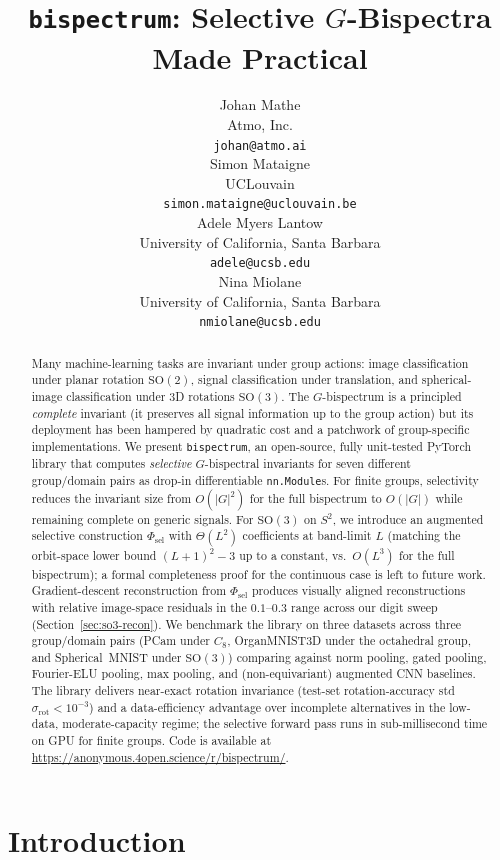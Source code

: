 \documentclass{article}
\title{\texttt{bispectrum}: Selective $G$-Bispectra Made Practical}
\author{%
  Johan Mathe \\
  Atmo, Inc. \\
  \texttt{johan@atmo.ai} \\
  \And
  Simon Mataigne \\
  UCLouvain \\
  \texttt{simon.mataigne@uclouvain.be} \\
  \And
  Adele Myers Lantow \\
  University of California, Santa Barbara \\
  \texttt{adele@ucsb.edu} \\
  \And
  Nina Miolane \\
  University of California, Santa Barbara \\
  \texttt{nmiolane@ucsb.edu} \\
}
\theoremstyle{definition}
\theoremstyle{remark}
\newcommand{\SO}{\mathrm{SO}}
\theoremstyle{definition}
\begin{document}
\maketitle

\begin{abstract}
Many machine-learning tasks are invariant under group actions: image
classification under planar rotation $\SO(2)$, signal classification
under translation, and spherical-image classification under 3D rotations
$\SO(3)$. The $G$-bispectrum is a principled \emph{complete} invariant
(it preserves all signal information up to the group action) but its
deployment has been hampered by quadratic cost and a patchwork of
group-specific implementations.
We present \texttt{bispectrum}, an open-source, fully unit-tested
PyTorch library that computes \emph{selective} $G$-bispectral
invariants for seven different group/domain pairs as drop-in
differentiable \texttt{nn.Module}s. For finite groups, selectivity
reduces the invariant size from $O(|G|^2)$ for the full bispectrum
to $O(|G|)$ while remaining complete on generic signals. For $\SO(3)$
on $S^2$, we introduce an augmented selective construction
$\Phi_{\mathrm{sel}}$ with $\Theta(L^2)$ coefficients at band-limit
$L$ (matching the orbit-space lower bound $(L{+}1)^2 - 3$ up to a
constant, vs.\ $O(L^3)$ for the full bispectrum); a formal
completeness proof for the continuous case is left to future work.
Gradient-descent reconstruction from $\Phi_{\mathrm{sel}}$ produces
visually aligned reconstructions with relative image-space residuals
in the $0.1$--$0.3$ range across our digit sweep
(Section~\ref{sec:so3-recon}).
We benchmark the library on three datasets across three group/domain
pairs (PCam under $C_8$, OrganMNIST3D under the octahedral group,
and Spherical~MNIST under $\SO(3)$) comparing against norm pooling,
gated pooling, Fourier-ELU pooling, max pooling, and (non-equivariant)
augmented CNN baselines. The library delivers near-exact rotation
invariance (test-set rotation-accuracy std $\sigma_{\mathrm{rot}} <
10^{-3}$) and a data-efficiency advantage over incomplete alternatives
in the low-data, moderate-capacity regime; the selective forward pass
runs in sub-millisecond time on GPU for finite groups.
Code is available at
\url{https://anonymous.4open.science/r/bispectrum/}.
\end{abstract}
\section{Introduction}
\label{sec:intro}
\end{document}

